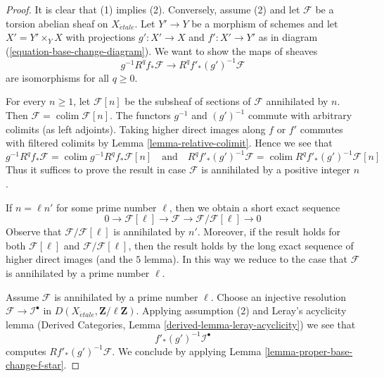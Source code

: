 \documentclass[10pt,a4paper]{amsart}
\theoremstyle{plain}
\theoremstyle{definition}
\theoremstyle{remark}
\numberwithin{equation}{subsection}
\def\colim{\mathop{\mathrm{colim}}\nolimits}
\def\etale{{\acute{e}tale}}
\begin{document}
\begin{proof}
It is clear that (1) implies (2). Conversely, assume (2) and let
$\mathcal{F}$ be a torsion abelian sheaf on $X_\etale$. Let $Y' \to Y$
be a morphism of schemes and let $X' = Y' \times_Y X$
with projections $g' : X' \to X$ and $f' : X' \to Y'$ as in
diagram (\ref{equation-base-change-diagram}).
We want to show the maps of sheaves
$$
g^{-1}R^qf_*\mathcal{F} \longrightarrow R^qf'_*(g')^{-1}\mathcal{F}
$$
are isomorphisms for all $q \geq 0$.

\medskip\noindent
For every $n \geq 1$, let $\mathcal{F}[n]$ be the subsheaf of sections
of $\mathcal{F}$ annihilated by $n$. Then
$\mathcal{F} = \colim \mathcal{F}[n]$.
The functors $g^{-1}$ and $(g')^{-1}$ commute with arbitrary colimits
(as left adjoints). Taking higher direct images along $f$ or $f'$
commutes with filtered colimits by Lemma \ref{lemma-relative-colimit}.
Hence we see that
$$
g^{-1}R^qf_*\mathcal{F} = \colim g^{-1}R^qf_*\mathcal{F}[n]
\quad\text{and}\quad
R^qf'_*(g')^{-1}\mathcal{F} =
\colim R^qf'_*(g')^{-1}\mathcal{F}[n]
$$
Thus it suffices to prove the result in case $\mathcal{F}$ is
annihilated by a positive integer $n$.

\medskip\noindent
If $n = \ell n'$ for some prime number $\ell$, then we obtain a short
exact sequence
$$
0 \to \mathcal{F}[\ell] \to \mathcal{F} \to
\mathcal{F}/\mathcal{F}[\ell] \to 0
$$
Observe that $\mathcal{F}/\mathcal{F}[\ell]$ is annihilated by $n'$.
Moreover, if the result holds for both $\mathcal{F}[\ell]$ and
$\mathcal{F}/\mathcal{F}[\ell]$, then the result holds by
the long exact sequence of higher direct images (and the $5$ lemma).
In this way we reduce to the case that $\mathcal{F}$ is annihilated
by a prime number $\ell$.

\medskip\noindent
Assume $\mathcal{F}$ is annihilated by a prime number $\ell$.
Choose an injective resolution $\mathcal{F} \to \mathcal{I}^\bullet$
in $D(X_\etale, \mathbf{Z}/\ell\mathbf{Z})$. Applying assumption
(2) and Leray's acyclicity lemma
(Derived Categories, Lemma \ref{derived-lemma-leray-acyclicity})
we see that
$$
f'_*(g')^{-1}\mathcal{I}^\bullet
$$
computes $Rf'_*(g')^{-1}\mathcal{F}$. We conclude by applying
Lemma \ref{lemma-proper-base-change-f-star}.
\end{proof}
\end{document}
